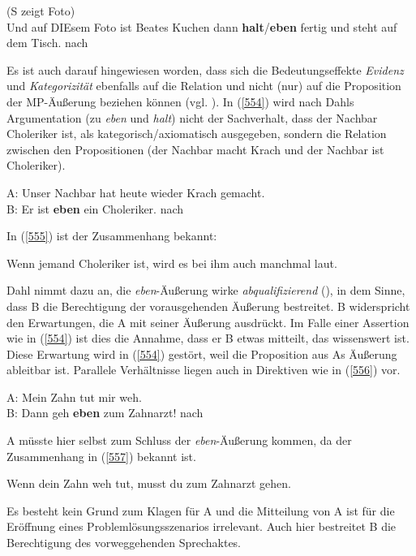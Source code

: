 \begin{exe}
	\ex\label{553} 
	(S zeigt Foto)\\
	Und auf DIEsem Foto ist Beates Kuchen dann \textbf{halt}/\textbf{eben} fertig und steht auf dem Tisch.		
	\hfill\hbox{nach \citet[99]{Autenrieth2002}} 
\end{exe}
Es ist auch darauf hingewiesen worden, dass sich die Bedeutungseffekte \textit{Evidenz} und \textit{Kategorizität} ebenfalls auf die Relation und nicht (nur) auf die Proposition der MP-Äußerung beziehen können (vgl. \citealt[99]{Dahl1988}). In (\ref{554}) wird nach Dahls Argumentation (zu \textit{eben} und \textit{halt}) nicht der Sachverhalt, dass der Nachbar Choleriker ist, als kategorisch/axiomatisch ausgegeben, sondern die Relation zwi\-schen den Propositionen (der Nachbar macht Krach und der Nachbar ist Choleriker).

\begin{exe}
	\ex\label{554} 
	A: Unser Nachbar hat heute wieder Krach gemacht.\\
	B: Er ist \textbf{eben} ein Choleriker.		
	\hfill\hbox{nach \citet[98]{Dahl1988}} 
\end{exe}
In (\ref{555}) ist der Zusammenhang bekannt:
\begin{exe}
	\ex\label{555} 
	Wenn jemand Choleriker ist, wird es bei ihm auch manchmal laut.
\end{exe}
Dahl nimmt dazu an, die \textit{eben}-Äußerung wirke \textit{abqualifizierend} (\citeyear[100]{Dahl1988}), in dem Sinne, dass B die Berechtigung der vorausgehenden Äußerung bestreitet. B widerspricht den Erwartungen, die A mit seiner Äußerung ausdrückt. Im Falle einer Assertion wie in (\ref{554}) ist dies die Annahme, dass er B etwas mitteilt, das wissenswert ist. Diese Erwartung wird in (\ref{554}) gestört, weil die Proposition aus As Äußerung ableitbar ist. Parallele Verhältnisse liegen auch in Direktiven wie in (\ref{556}) vor.
\begin{exe}
	\ex\label{556} 
	A: Mein Zahn tut mir weh.\\
	B: Dann geh \textbf{eben} zum Zahnarzt!
	\hfill\hbox{nach \citet[101]{Dahl1988}} 
\end{exe}
A müsste hier selbst zum Schluss der \textit{eben}-Äußerung kommen, da der Zusammenhang in (\ref{557}) bekannt ist.
\begin{exe}
	\ex\label{557} 
	Wenn dein Zahn weh tut, musst du zum Zahnarzt gehen.
\end{exe}
Es besteht kein Grund zum Klagen für A und die Mitteilung von A ist für die Eröffnung eines Problemlösungsszenarios irrelevant. Auch hier bestreitet B die Berechtigung des vorweggehenden Sprechaktes.


